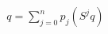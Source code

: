 \documentclass[preview]{standalone}
\begin{document}
\begin{align*}
q = \sum_{j=0}^{n} p_j (S^j q)
\end{align*}
\end{document}
